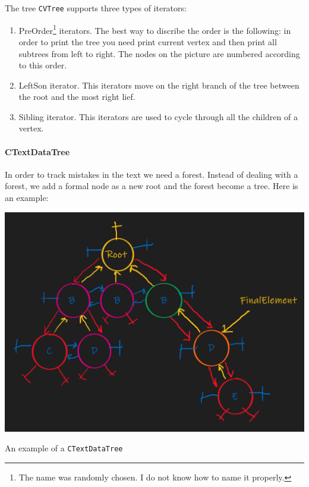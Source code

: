 \documentclass{article}
\begin{document}
The tree \verb"CVTree" supports three types of iterators:
\begin{enumerate}
\item PreOrder\footnote{The name was randomly chosen. I do not know how to name it properly.} iterators. The best way to discribe the order is the following: in order to print the tree you need print current vertex and then print all subtrees from left to right. The nodes on the picture are numbered according to this order.

\item LeftSon iterator. This iterators move on the right branch of the tree between the root and the most right lief.

\item Sibling iterator. This iterators are used to cycle through all the children of a vertex.
\end{enumerate}

\paragraph{CTextDataTree}

In order to track mistakes in the text we need a forest. Instead of dealing with a forest, we add a formal node as a new root and the forest become a tree. Here is an example:
\begin{center}
\includegraphics[scale = 0.4]{Figures/TreePrimitives3a.png}

An example of a \verb"CTextDataTree"
\end{center}
\end{document}
